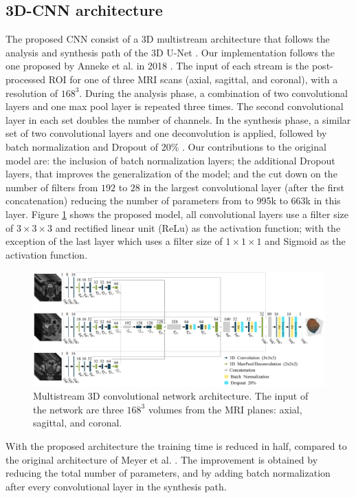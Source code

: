 \subsection{3D-CNN architecture}
The proposed CNN consist of a 3D multistream architecture that follows the analysis and synthesis path of the 3D U-Net \cite{cciccek20163d}. Our implementation follows the one proposed by Anneke et al. in 2018  \cite{anneke}. The input of each stream is the post-processed ROI for one of three MRI scans (axial, sagittal, and coronal), with a resolution of $168^3$. During the analysis phase, a combination of two convolutional layers and one max pool layer is repeated three times. The second convolutional layer in each set doubles the number of channels.  In the synthesis phase, a similar set of two convolutional layers and one deconvolution is applied, followed by batch normalization and Dropout of 20\% \cite{hinton2012improving}. Our contributions
to the original model are: the inclusion of batch normalization layers; the additional Dropout layers, that improves the generalization of the model; and the cut down on the number of filters from $192$ to $28$ in the largest convolutional layer (after the first concatenation) reducing the number of parameters from to 995k to 663k in this layer. Figure \ref{fig:nn} shows the proposed model, all convolutional layers use a filter size of $3 \times 3 \times 3$ and rectified linear unit (ReLu) as the activation function; with the exception of the last layer which uses a filter size of $1 \times 1 \times 1$ and Sigmoid as the activation function. 
\begin{figure}[h]
    \centering
    \includegraphics[totalheight=.282\textheight]{figures/Figure3.eps}
    \caption{Multistream 3D convolutional network architecture. The input of the network are three $168^3$ volumes from the MRI planes: axial, sagittal, and coronal. }
    \label{fig:nn}
\end{figure}

With the proposed architecture the training time is reduced in half, compared to the original architecture of Meyer et al. \cite{anneke}. The improvement is obtained by reducing the total number of parameters, and by adding batch normalization after every convolutional layer in the synthesis path.

